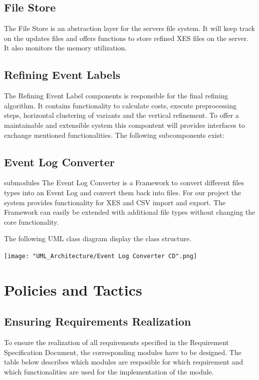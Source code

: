 \documentclass[notitlepage]{article}
\begin{document}
\begin{flushleft}
\subsection{File Store}
The File Store is an abstraction layer for the servers file system. It will keep track on the updates files and offers functions to store 
refined XES files on the server. It also monitors the memory utilization.
\subsection{Refining Event Labels}
The Refining Event Label components is responsible for the final refining algorithm. 
It contains functionality to calculate costs, execute preprocessing steps, horizontal clustering of variants and the vertical refinement.
To offer a maintainable and extensible system this compontent will provides interfaces to exchange mentioned functionalities. 
The following subcomponents exist: 


\subsection{Event Log Converter}submodules
The Event Log Converter is a Framework to convert different files types into an Event Log and convert them back into files. 
For our project the system provides functionality for XES and CSV import and export. 
The Framework can easily be extended with additional file types without changing the core functionality.

The following UML class diagram display the class structure.

\begin{landscape}
\texttt{[image: "UML\_Architecture/Event Log Converter CD".png]}
\end{landscape}






\section{Policies and Tactics}


\subsection{Ensuring Requirements Realization}
To ensure the realization of all requirements specified in the Requirement Specification Document, the corresponding modules have to be designed.
The table below describes which modules are resposible for which requirement and which functionalities are used for the implementation of the module. \\


\end{flushleft}
\end{document}
